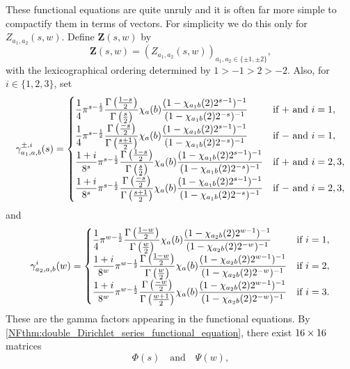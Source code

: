     These functional equations are quite unruly and it is often far more simple to compactify them in terms of vectors. For simplicity we do this only for $Z_{a_{1},a_{2}}(s,w)$. Define $\mathbf{Z}(s,w)$ by
    \[
        \mathbf{Z}(s,w) = (Z_{a_{1},a_{2}}(s,w))_{a_{1},a_{2} \in \{\pm 1, \pm 2\}},
    \]
    with the lexicographical ordering determined by $1 > -1 > 2 > -2$. Also, for $i \in \{1,2,3\}$, set
    \[
        \gamma_{a_{1},a,b}^{\pm,i}(s) = \begin{cases} \dfrac{1}{4}\pi^{s-\frac{1}{2}}\dfrac{\Gamma\left(\frac{1-s}{2}\right)}{\Gamma\left(\frac{s}{2}\right)}\chi_{a}(b)\dfrac{(1-\chi_{a_{1}b}(2)2^{s-1})^{-1}}{(1-\chi_{a_{1}b}(2)2^{-s})^{-1}} & \text{if $+$ and $i = 1$}, \\ \dfrac{1}{4}\pi^{s-\frac{1}{2}}\dfrac{\Gamma\left(\frac{-s}{2}\right)}{\Gamma\left(\frac{s+1}{2}\right)}\chi_{a}(b)\dfrac{(1-\chi_{a_{1}b}(2)2^{s-1})^{-1}}{(1-\chi_{a_{1}b}(2)2^{-s})^{-1}} & \text{if $-$ and $i = 1$}, \\ \dfrac{1+i}{8^{s}}\pi^{s-\frac{1}{2}}\dfrac{\Gamma\left(\frac{1-s}{2}\right)}{\Gamma\left(\frac{s}{2}\right)}\chi_{a}(b)\dfrac{(1-\chi_{a_{1}b}(2)2^{s-1})^{-1}}{(1-\chi_{a_{1}b}(2)2^{-s})^{-1}} & \text{if $+$ and $i = 2,3$}, \\ \dfrac{1+i}{8^{s}}\pi^{s-\frac{1}{2}}\dfrac{\Gamma\left(\frac{-s}{2}\right)}{\Gamma\left(\frac{s+1}{2}\right)}\chi_{a}(b)\dfrac{(1-\chi_{a_{1}b}(2)2^{s-1})^{-1}}{(1-\chi_{a_{1}b}(2)2^{-s})^{-1}} & \text{if $-$ and $i = 2,3$}, \end{cases}
    \]
    and
    \[
        \gamma_{a_{2},a,b}^{i}(w) = \begin{cases} \dfrac{1}{4}\pi^{w-\frac{1}{2}}\dfrac{\Gamma\left(\frac{1-w}{2}\right)}{\Gamma\left(\frac{w}{2}\right)}\chi_{a}(b)\dfrac{(1-\chi_{a_{2}b}(2)2^{w-1})^{-1}}{(1-\chi_{a_{2}b}(2)2^{-w})^{-1}} & \text{if $i = 1$}, \\ \dfrac{1+i}{8^{w}}\pi^{w-\frac{1}{2}}\dfrac{\Gamma\left(\frac{1-w}{2}\right)}{\Gamma\left(\frac{w}{2}\right)}\chi_{a}(b)\dfrac{(1-\chi_{a_{2}b}(2)2^{w-1})^{-1}}{(1-\chi_{a_{2}b}(2)2^{-w})^{-1}} & \text{if $i = 2$}, \\ \dfrac{1+i}{8^{w}}\pi^{w-\frac{1}{2}}\dfrac{\Gamma\left(\frac{-w}{2}\right)}{\Gamma\left(\frac{w+1}{2}\right)}\chi_{a}(b)\dfrac{(1-\chi_{a_{2}b}(2)2^{w-1})^{-1}}{(1-\chi_{a_{2}b}(2)2^{-w})^{-1}} & \text{if $i = 3$}. \end{cases}
    \]
    These are the gamma factors appearing in the functional equations. By \cref{NFthm:double_Dirichlet_series_functional_equation}, there exist $16 \times 16$ matrices
    \[
        \Phi(s) \quad \text{and} \quad \Psi(w),
    \]
